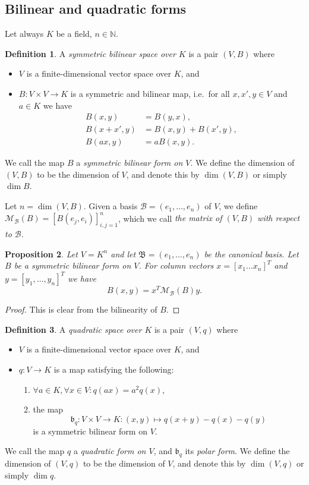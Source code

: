 \documentclass[12pt, leqno, british]{amsart}
\theoremstyle{definition}
\newtheorem{defi}{Definition}[subsection]
\theoremstyle{plain}
\newtheorem{prop}[defi]{Proposition}
\theoremstyle{remark}
\newcommand{\mc}{\mathcal}
\newcommand{\mf}{\mathfrak}
\newcommand{\mbb}{\mathbb}
\newcommand{\nat}{\mbb N}
\begin{document}
\subsection{Bilinear and quadratic forms}
Let always $K$ be a field, $n \in \nat$.
\begin{defi}
A \emph{symmetric bilinear space over $K$} is a pair $(V, B)$ where
\begin{itemize}
\item $V$ is a finite-dimensional vector space over $K$, and
\item $B : V \times V \to K$ is a symmetric and bilinear map, i.e.~for all $x, x', y \in V$ and $a \in K$ we have
\begin{align*}
B(x, y) &= B(y, x), \\
B(x+x',y) &= B(x, y) + B(x', y), \\
B(ax, y) &= aB(x, y).
\end{align*}
\end{itemize}
We call the map $B$ a \emph{symmetric bilinear form on $V$}.
We define the dimension of $(V, B)$ to be the dimension of $V$, and denote this by $\dim(V, B)$ or simply $\dim B$.

Let $n = \dim (V, B)$. Given a basis $\mc{B} = (e_1, \ldots, e_n)$ of $V$, we define $\mc{M}_\mc{B}(B) = [B(e_j, e_i)]_{i, j=1}^n$, which we call \emph{the matrix of $(V, B)$ with respect to $\mc{B}$}.
\end{defi}
\begin{prop}
Let $V = K^n$ and let $\mf{B} = (e_1, \ldots, e_n)$ be the canonical basis.
Let $B$ be a symmetric bilinear form on $V$.
For column vectors $x = [x_1 \ldots x_n]^T$ and $y = [y_1, \ldots, y_n]^T$ we have
$$ B(x, y) = x^T\mc{M}_{\mc{B}}(B)y.$$
\end{prop}
\begin{proof}
This is clear from the bilinearity of $B$.
\end{proof}
\begin{defi}\label{D:QF}
A \emph{quadratic space over $K$} is a pair $(V, q)$ where
\begin{itemize}
\item $V$ is a finite-dimensional vector space over $K$, and
\item $q : V \to K$ is a map satisfying the following:
\begin{enumerate}
\item $\forall a \in K, \forall x \in V : q(ax) = a^2q(x)$,
\item the map $$\mf{b}_q : V \times V \to K : (x, y) \mapsto q(x+y) - q(x) - q(y) $$
is a symmetric bilinear form on $V$.
\end{enumerate}
\end{itemize}
We call the map $q$ a \emph{quadratic form on $V$}, and $\mf{b}_q$ its \emph{polar form}.
We define the dimension of $(V, q)$ to be the dimension of $V$, and denote this by $\dim(V, q)$ or simply $\dim q$.
\end{defi}
\end{document}
